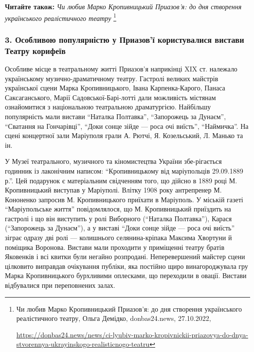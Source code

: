 
\textbf{Читайте також:} \emph{Чи любив Марко Кропивницький Приазов'я: до дня створення українського реалістичного театру}%
\footnote{Чи любив Марко Кропивницький Приазов'я: до дня створення українського реалістичного театру, Ольга Демідко, donbas24.news, %
27.10.2022, \par%
\url{https://donbas24.news/news/ci-lyubiv-marko-kropivnickii-priazovya-do-dnya-stvorennya-ukrayinskogo-realisticnogo-teatru}
}

\subsubsection{3. Особливою популярністю у Приазов'ї користувалися вистави Театру корифеїв}

Особливе місце в театральному житті Приазов'я наприкінці XIX ст.  належало
українському музично-драматичному театру. Гастролі великих майстрів української
сцени Марка Кропивницького, Івана Карпенка-Карого, Панаса Саксаганського, Марії
Садовської-Барі\hyp{}лотті дали можливість містянам ознайомитися з національною
театральною драматургією. Найбільшу популярність мали вистави \enquote{Наталка
Полтавка}, \enquote{Запорожець за Дунаєм}, \enquote{Сватання на Гончарівці}, \enquote{Доки сонце зійде
— роса очі виїсть}, \enquote{Наймичка}. На сцені концертної зали Маріуполя грали А.
Рютчі, Я. Козельський, Л. Манько та ін.

У Музеї театрального, музичного та кіномистецтва України збе\hyp{}рігається годинник
із лаконічним написом: \enquote{Кропивницькому від маріупольців 29.09.1889 р.}. Цей
подарунок є матеріальним свідченням того, що дійсно в 1889 році М.
Кропивницький виступав у Маріуполі. Влітку 1908 року антрепренер М. Кононенко
запросив М. Кропивницького приїхати в Маріуполь. У міській газеті
\enquote{Маріупольське життя} повідомлялося, що М. Кропивницький приїздить на гастролі
і що він виступить у ролі Виборного (\enquote{Наталка Полтавка}), Карася (\enquote{Запорожець
за Дунаєм}), а у виставі \enquote{Доки сонце зійде — роса очі виїсть} зіграє одразу дві
ролі — колишнього селянина-кріпака Максима Хвортуни й поміщика Воронова.
Вистави мали проходити у приміщенні театру братів Яковенків і всі квитки були
негайно розпродані. Неперевершений майстер сцени цілковито виправдав очікування
публіки, яка постійно щиро винагороджувала гру Марка Кропивницького бурхливими
оплесками, що переходили в овації. Вистави відбувалися при переповнених залах.


